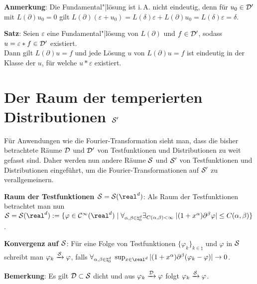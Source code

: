 \textbf{Anmerkung}:
Die Fundamental"|lösung ist i.\,A. nicht eindeutig, denn für
$u_0 \in \D'$ mit $L(\partial) u_0 = 0$ gilt
$L(\partial)(\varepsilon + u_0) = L(\delta)\varepsilon + L(\partial)u_0 =
L(\delta)\varepsilon = \delta$.

\textbf{Satz}:
Seien $\varepsilon$ eine Fundamental"|lösung von $L(\partial)$ und
$f \in \D'$, sodass $u = \varepsilon \ast f \in \D'$ existiert.\\
Dann gilt $L(\partial)u = f$ und jede Lösung $u$ von $L(\partial)u = f$
ist eindeutig in der Klasse der $u$, für welche $u \ast \varepsilon$ existiert.

\pagebreak

\section{%
    Der Raum der temperierten Distributionen \texorpdfstring{$\S'$}{S'}%
}

Für Anwendungen wie die Fourier-Transformation sieht man, dass die bisher
betrachtete Räume $\D$ und $\D'$ von Testfunktionen und Distributionen
zu weit gefasst sind.
Daher werden nun andere Räume $\S$ und $\S'$ von Testfunktionen und
Distributionen eingeführt, um die Fourier-Transformationen auf $\S'$
zu verallgemeinern.

\textbf{Raum der Testfunktionen $\S = \S(\real^d)$}:
Als Raum der Testfunktionen betrachtet man nun\\
$\S = \S(\real^d) := \{\varphi \in \C^\infty(\real^d) \;|\;
\forall_{\alpha, \beta \in \natural_0^d} \exists_{C(\alpha, \beta) < \infty}\;
|(1 + x^\alpha)\partial^\beta \varphi| \le C(\alpha, \beta)\}$.

\textbf{Konvergenz auf $\S$}:
Für eine Folge von Testfunktionen $\{\varphi_k\}_{k \in \natural}$ und
$\varphi$ in $\S$ schreibt man $\varphi_k \xrightarrow{\S} \varphi$, falls
$\forall_{\alpha, \beta \in \natural_0^d}\;
\sup_{x \in \real^d} |(1 + x^\alpha) \partial^\beta (\varphi_k - \varphi)|
\to 0$.

\textbf{Bemerkung}:
Es gilt $\D \subset \S$ dicht und aus
$\varphi_k \xrightarrow{\D} \varphi$ folgt
$\varphi_k \xrightarrow{\S} \varphi$.

